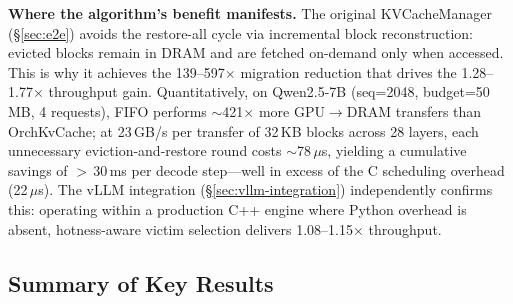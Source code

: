 \documentclass[conference]{IEEEtran}
\begin{document}
\textbf{Where the algorithm's benefit manifests.} The original KVCacheManager (\S\ref{sec:e2e}) avoids the restore-all cycle via incremental block reconstruction: evicted blocks remain in DRAM and are fetched on-demand only when accessed.  This is why it achieves the 139--597$\times$ migration reduction that drives the 1.28--1.77$\times$ throughput gain.  Quantitatively, on Qwen2.5-7B (seq=2048, budget=50\,MB, 4 requests), FIFO performs ${\sim}$421$\times$ more GPU$\to$DRAM transfers than OrchKvCache; at 23\,GB/s per transfer of 32\,KB blocks across 28 layers, each unnecessary eviction-and-restore round costs ${\sim}$78\,$\mu$s, yielding a cumulative savings of $>$\,30\,ms per decode step---well in excess of the C scheduling overhead (22\,$\mu$s).  The vLLM integration (\S\ref{sec:vllm-integration}) independently confirms this: operating within a production C++ engine where Python overhead is absent, hotness-aware victim selection delivers 1.08--1.15$\times$ throughput.

\subsection{Summary of Key Results}
\end{document}
